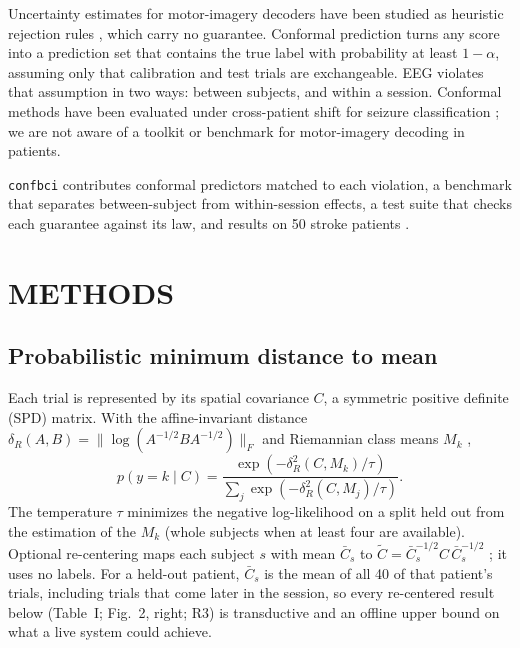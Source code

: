 \documentclass[letterpaper, 10pt, conference]{ieeeconf}
\newcommand{\dR}{\delta_R}
\begin{document}
Uncertainty estimates for motor-imagery decoders have been studied as heuristic
rejection rules \cite{uqmi2025}, which carry no guarantee. Conformal prediction
\cite{vovk2005,angelopoulos2023} turns any score into a prediction set that
contains the true label with probability at least $1-\alpha$, assuming only that
calibration and test trials are exchangeable. EEG violates that assumption in two
ways: between subjects, and within a session. Conformal methods have been
evaluated under cross-patient shift for seizure classification
\cite{eegconformal2026}; we are not aware of a toolkit or benchmark for
motor-imagery decoding in patients.

\texttt{confbci} contributes conformal predictors matched to each violation, a
benchmark that separates between-subject from within-session effects, a test
suite that checks each guarantee against its law, and results on 50 stroke
patients \cite{liu2024}.

\section{METHODS}
\subsection{Probabilistic minimum distance to mean}
Each trial is represented by its spatial covariance $C$, a symmetric positive
definite (SPD) matrix. With the affine-invariant distance
$\dR(A,B)=\|\log(A^{-1/2}BA^{-1/2})\|_F$ and Riemannian class means $M_k$
\cite{barachant2012},
\begin{equation}
p(y=k\mid C)=\frac{\exp(-\dR^2(C,M_k)/\tau)}{\sum_j \exp(-\dR^2(C,M_j)/\tau)} .
\end{equation}
The temperature $\tau$ minimizes the negative log-likelihood on a split held out
from the estimation of the $M_k$ (whole subjects when at least four are
available). Optional re-centering maps each subject $s$ with mean $\bar C_s$ to
$\tilde C=\bar C_s^{-1/2}C\,\bar C_s^{-1/2}$ \cite{zanini2018}; it uses no labels.
For a held-out patient, $\bar C_s$ is the mean of all 40 of that patient's
trials, including trials that come later in the session, so every re-centered
result below (Table~I; Fig.~2, right; R3) is transductive and an offline upper
bound on what a live system could achieve.
\end{document}
